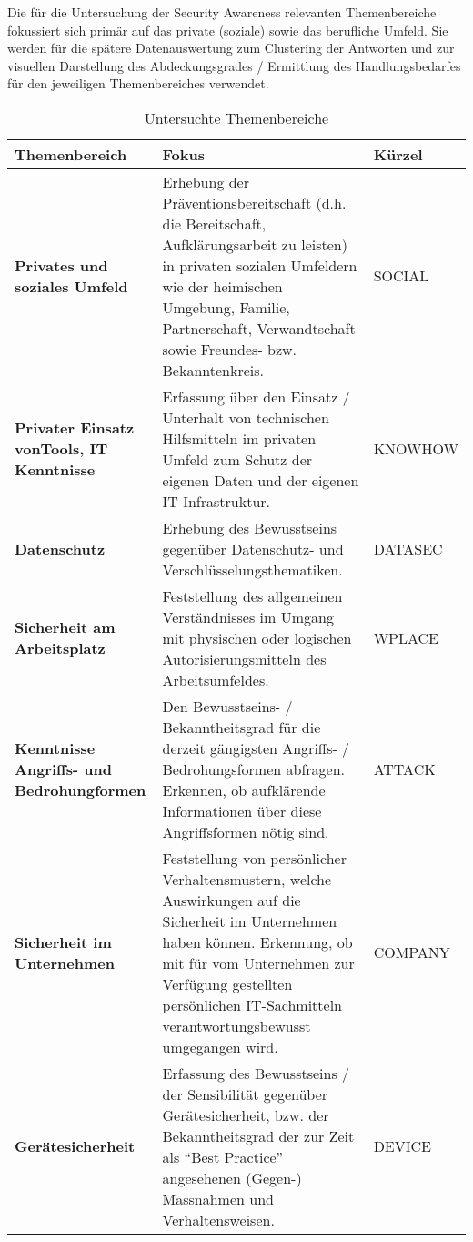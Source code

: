 \documentclass[../../main.tex]{subfiles}
\begin{document}
\begin{sloppypar}
Die für die Untersuchung der Security Awareness relevanten Themenbereiche fokussiert sich primär auf das private (soziale) sowie das berufliche Umfeld. Sie werden für die spätere Datenauswertung zum Clustering der Antworten und zur visuellen Darstellung des Abdeckungsgrades / Ermittlung des Handlungsbedarfes für den jeweiligen Themenbereiches verwendet.
\end{sloppypar}



\sloppy 

\begin{table}[H]
\tablefontsize	
\centering
\caption{Untersuchte Themenbereiche}
\label{themenbereiche}

\begin{tabular}{ |p{4cm}|p{9.5cm}|p{2.0cm}|}

\hline
\tableheaderbgcolor
\textbf{Themenbereich} & \textbf{Fokus} & \textbf{Kürzel}\\ 
\hline
\textbf{Privates und \newline soziales Umfeld} & Erhebung der Präventionsbereitschaft (d.h. die Bereitschaft, Aufklärungsarbeit zu leisten) in privaten sozialen Umfeldern wie der heimischen Umgebung, Familie, Partnerschaft, Verwandtschaft sowie Freundes- bzw. Bekanntenkreis. & SOCIAL\\
\hline
\textbf{Privater Einsatz von\newline Tools, IT Kenntnisse} & Erfassung über den Einsatz / Unterhalt von technischen Hilfsmitteln im privaten Umfeld zum Schutz der eigenen Daten und der eigenen IT-Infrastruktur. & KNOWHOW\\
\hline
\textbf{Datenschutz} & Erhebung des Bewusstseins gegenüber Datenschutz- und Verschlüsselungsthematiken. & DATASEC\\
\hline
\textbf{Sicherheit am \newline Arbeitsplatz} & Feststellung des allgemeinen Verständnisses im Umgang mit physischen oder logischen Autorisierungsmitteln des Arbeitsumfeldes. & WPLACE\\
\hline
\textbf{Kenntnisse Angriffs- \newline und Bedrohungformen} & Den Bewusstseins- / Bekanntheitsgrad für die derzeit gängigsten Angriffs- / Bedrohungsformen abfragen. Erkennen, ob aufklärende Informationen über diese Angriffsformen nötig sind. & ATTACK\\
\hline
\textbf{Sicherheit im \newline Unternehmen} & Feststellung von persönlicher Verhaltensmustern, welche Auswirkungen auf die Sicherheit im Unternehmen haben können. Erkennung, ob mit für vom Unternehmen zur Verfügung gestellten persönlichen IT-Sachmitteln verantwortungsbewusst umgegangen wird. & COMPANY\\
\hline
\textbf{Gerätesicherheit} & Erfassung des Bewusstseins / der Sensibilität gegenüber Gerätesicherheit, bzw. der Bekanntheitsgrad der zur Zeit als "`Best Practice"' angesehenen (Gegen-) Massnahmen und Verhaltensweisen. & DEVICE\\
\hline

\end{tabular}
\end{table}
\end{document}
